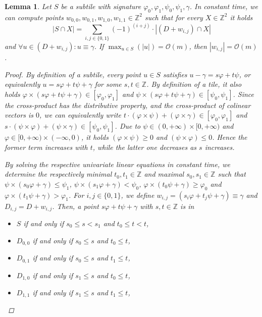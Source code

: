 \documentclass[11pt, letterpaper]{article}
\theoremstyle{plain}
\newtheorem{lemma}{Lemma}
\theoremstyle{definition}
\theoremstyle{remark}
\renewcommand{\O}{\mathcal{O}}
\renewcommand{\phi}{\varphi}
\newcommand{\absolute}[1]{\left\lvert#1\right\rvert}
\begin{document}
\begin{lemma}\label{primitive}
Let $S$ be a subtile with signature $\phi_0, \phi_1, \psi_0, \psi_1, \gamma$. In constant time, we can compute points $w_{0,0},w_{0,1},w_{1,0},w_{1,1} \in \mathbb Z^2$ such that for every $X \in \mathbb Z^2$ it holds
\[ \absolute{S \cap X} = \sum_{i,j \in \{0,1\}} (-1)^{(i+j)} \cdot \absolute{(D + w_{i,j}) \cap X}\]
and $\forall u \in (D + w_{i,j}) : u \equiv \gamma$. If $\max_{u \in S}(\absolute{u}) = \O(m)$, then $\absolute{w_{i,j}} = \O(m)$.

\begin{proof}
By definition of a subtile, every point $u \in S$ satisfies $u - \gamma = s\phi + t\psi$, or equivalently $u = s\phi + t\psi + \gamma$ for some $s,t\in\mathbb Z$. 
By definition of a tile, it also holds $\phi \times (s\phi + t\psi + \gamma) \in [\phi_0, \phi_1]$ and $\psi \times (s\phi + t\psi + \gamma) \in [\psi_0, \psi_1]$. Since the cross-product has the distributive property, and the cross-product of colinear vectors is $0$, we can equivalently write $t \cdot (\phi \times \psi) + (\phi \times \gamma) \in [\phi_0, \phi_1]$ and $s \cdot (\psi \times \phi) + (\psi \times \gamma) \in [\psi_0, \psi_1]$. 
Due to $\psi \in (0, +\infty) \times [0, +\infty)$ and $\phi \in [0, +\infty) \times (-\infty, 0)$, it holds $(\phi \times \psi) \geq 0$ and $(\psi \times \phi) \leq 0$. Hence the former term increases with $t$, while the latter one decreases as $s$ increases.

By solving the respective univariate linear equations in constant time, we determine the respectively minimal $t_0, t_1 \in \mathbb Z$ and maximal $s_0, s_1 \in \mathbb Z$ such that $\psi \times (s_0\phi + \gamma) \leq \psi_1$, $\psi \times (s_1\phi + \gamma) < \psi_0$, $\phi \times (t_0\psi + \gamma) \geq \phi_0$ and $\phi \times (t_1\psi + \gamma) > \phi_1$.
For $i,j \in \{0, 1\}$, we define $w_{i, j} = (s_i\phi + t_j\psi + \gamma) \equiv \gamma$ and $D_{i,j} = D + w_{i,j}$. 
Then, a point $s\phi + t\psi + \gamma$ with $s,t \in \mathbb Z$ is in 
\begin{itemize}
	\item $S$ if and only if $s_0 \leq s < s_1$ and $t_0 \leq t < t$,
	\item $D_{0, 0}$ if and only if $s_0 \leq s$ and $t_0 \leq t$,
	\item $D_{0, 1}$ if and only if $s_0 \leq s$ and $t_1 \leq t$,
	\item $D_{1, 0}$ if and only if $s_1 \leq s$ and $t_0 \leq t$,
	\item $D_{1, 1}$ if and only if $s_1 \leq s$ and $t_1 \leq t$,%
	~~~~~~~~\begin{tikzpicture}[overlay, x=.6em, y=.6em]


\end{tikzpicture}
\end{itemize}
\end{proof}
\end{lemma}
\end{document}
